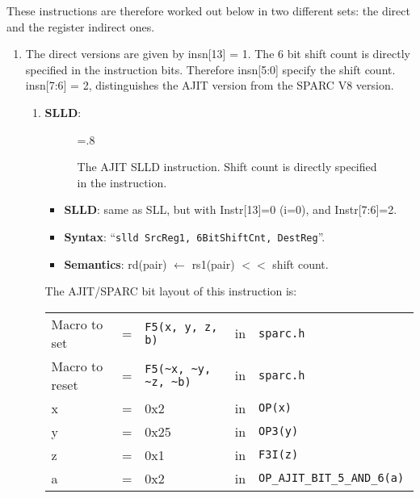 These instructions  are therefore  worked out  below in  two different
sets: the direct and the register indirect ones.
\begin{enumerate}
\item The direct versions are given by  insn[13] = 1.  The 6 bit shift
  count  is directly  specified  in the  instruction bits.   Therefore
  insn[5:0] specify the shift count.  insn[7:6] = 2, distinguishes the
  AJIT version from the SPARC V8 version.
  \begin{enumerate}
  \item \textbf{SLLD}:\\
    \begin{center}
      \begin{figure}[h]
        \centering
        \epsfxsize=.8\linewidth
        \caption{The AJIT  SLLD instruction.  Shift count  is directly
          specified in the instruction.}
        \label{fig:ajit:slld:insn}
      \end{figure}
    \end{center}
    \begin{itemize}
    \item []\textbf{SLLD}: same as SLL, but with Instr[13]=0 (i=0),
      and Instr[7:6]=2.
    \item []\textbf{Syntax}: ``\texttt{slld SrcReg1, 6BitShiftCnt,
        DestReg}''. \\
    \item []\textbf{Semantics}: rd(pair) $\leftarrow$ rs1(pair) $<<$
      shift count.
    \end{itemize}

    The AJIT/SPARC bit layout of this instruction is:

    \begin{tabular}[h]{lclcl}
      Macro to set   &=&  \verb|F5(x, y, z, b)|     &in& \verb|sparc.h|     \\
      Macro to reset &=&  \verb|F5(~x, ~y, ~z, ~b)| &in& \verb|sparc.h|     \\
      x &=& 0x2      &in& \verb|OP(x) | \\
      y &=& 0x25     &in& \verb|OP3(y) | \\
      z &=& 0x1      &in& \verb|F3I(z) | \\
      a &=& 0x2      &in& \verb|OP_AJIT_BIT_5_AND_6(a) |
    \end{tabular}


\end{enumerate}
\end{enumerate}
